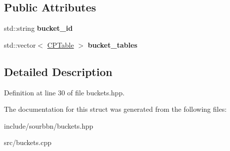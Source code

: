 \subsection*{Public Attributes}
\begin{DoxyCompactItemize}
\item 
\mbox{\label{structsourbbn_1_1Bucket_a8fc740fec9c981b4ec5f1f7cfdad583b}} 
std\+::string {\bfseries bucket\+\_\+id}
\item 
\mbox{\label{structsourbbn_1_1Bucket_afd1f29b2aa4d81d7af0cb635c6b17366}} 
std\+::vector$<$ \hyperlink{structsourbbn_1_1CPTable}{C\+P\+Table} $>$ {\bfseries bucket\+\_\+tables}
\end{DoxyCompactItemize}


\subsection{Detailed Description}


Definition at line 30 of file buckets.\+hpp.



The documentation for this struct was generated from the following files\+:\begin{DoxyCompactItemize}
\item 
include/sourbbn/buckets.\+hpp\item 
src/buckets.\+cpp\end{DoxyCompactItemize}
